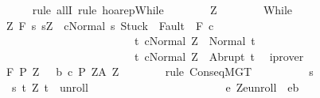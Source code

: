 \begin{isabellebody}
\ \ \ \ \isamarkupfalse%
\ {\isacharparenleft}rule\ allI{\isacharcomma}\ rule\ hoarep{\isachardot}While{\isacharparenright}\isanewline
\ \ \ \ \ \ \isamarkupfalse%
\ Z\isanewline
\ \ \ \ \ \ \isamarkupfalse%
\ While\ \isanewline
\ \ \ \ \ \ \isamarkupfalse%
\ {\isachardoublequoteopen}{\isasymforall}Z{\isachardot}\ {\isasymGamma}{\isacharcomma}{\isasymTheta}{\isasymturnstile}\isactrlbsub {\isacharslash}F\isactrlesub \ {\isacharbraceleft}s{\isachardot}\ s{\isacharequal}Z\ {\isasymand}\ {\isasymGamma}{\isasymturnstile}{\isasymlangle}c{\isacharcomma}Normal\ s{\isasymrangle}\ {\isasymRightarrow}{\isasymnotin}{\isacharparenleft}{\isacharbraceleft}Stuck{\isacharbraceright}\ {\isasymunion}\ Fault\ {\isacharbackquote}\ {\isacharparenleft}{\isacharminus}F{\isacharparenright}{\isacharparenright}{\isacharbraceright}\ c\isanewline
\ \ \ \ \ \ \ \ \ \ \ \ \ \ \ \ \ \ \ \ \ \ \ \ {\isacharbraceleft}t{\isachardot}\ {\isasymGamma}{\isasymturnstile}{\isasymlangle}c{\isacharcomma}Normal\ Z{\isasymrangle}\ {\isasymRightarrow}\ Normal\ t{\isacharbraceright}{\isacharcomma}\isanewline
\ \ \ \ \ \ \ \ \ \ \ \ \ \ \ \ \ \ \ \ \ \ \ \ {\isacharbraceleft}t{\isachardot}\ {\isasymGamma}{\isasymturnstile}{\isasymlangle}c{\isacharcomma}Normal\ Z{\isasymrangle}\ {\isasymRightarrow}\ Abrupt\ t{\isacharbraceright}{\isachardoublequoteclose}\ \isamarkupfalse%
\ iprover\isanewline
\ \ \ \ \ \ \isamarkupfalse%
\ \isamarkupfalse%
\ {\isachardoublequoteopen}{\isasymGamma}{\isacharcomma}{\isasymTheta}{\isasymturnstile}\isactrlbsub {\isacharslash}F\isactrlesub \ {\isacharparenleft}{\isacharquery}P{\isacharprime}\ Z\ \ {\isasyminter}\ b{\isacharparenright}\ c\ {\isacharparenleft}{\isacharquery}P{\isacharprime}\ Z{\isacharparenright}{\isacharcomma}{\isacharparenleft}{\isacharquery}A{\isacharprime}\ Z{\isacharparenright}{\isachardoublequoteclose}\isanewline
\ \ \ \ \ \ \isamarkupfalse%
\ {\isacharparenleft}rule\ ConseqMGT{\isacharparenright}\isanewline
\ \ \ \ \ \ \ \ \isamarkupfalse%
\ s\isanewline
\ \ \ \ \ \ \ \ \isamarkupfalse%
\ \ {\isachardoublequoteopen}s{\isasymin}\ {\isacharbraceleft}t{\isachardot}\ {\isacharparenleft}Z{\isacharcomma}\ t{\isacharparenright}\ {\isasymin}\ {\isacharquery}unroll\ {\isasymand}\ \isanewline
\ \ \ \ \ \ \ \ \ \ \ \ \ \ \ \ \ \ \ \ \ \ {\isacharparenleft}{\isasymforall}e{\isachardot}\ {\isacharparenleft}Z{\isacharcomma}e{\isacharparenright}{\isasymin}{\isacharquery}unroll\ {\isasymlongrightarrow}\ e{\isasymin}b\isanewline

\end{isabellebody}

